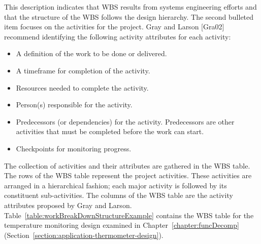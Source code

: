 This description indicates that WBS results from systems engineering
efforts and that the structure of the WBS follows the design hierarchy.
The second bulleted item focuses on the activities for the project. Gray
and Larson {[}Gra02{]} recommend identifying the following activity
attributes for each activity:

\begin{itemize}
\item
  A definition of the work to be done or delivered.
\item
  A timeframe for completion of the activity.
\item
  Resources needed to complete the activity.
\item
  Person(s) responsible for the activity.
\item
  Predecessors (or dependencies) for the activity. Predecessors are
  other activities that must be completed before the work can start.
\item
  Checkpoints for monitoring progress.
\end{itemize}

The collection of activities and their attributes are gathered in the
WBS table. The rows of the WBS table represent the project activities.
These activities are arranged in a hierarchical fashion; each major
activity is followed by its constituent sub-activities. The columns of
the WBS table are the activity attributes proposed by Gray and Larson.
Table~\ref{table:workBreakDownStructureExample}
contains the WBS table for the temperature monitoring design
examined in Chapter~\ref{chapter:funcDecomp} 
(Section~\ref{section:application-thermometer-design}).

